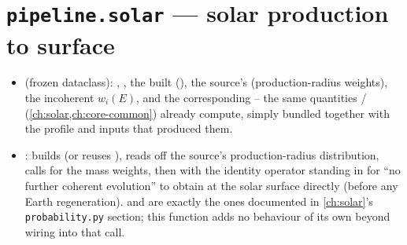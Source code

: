 \section{\texttt{pipeline.solar} --- solar production to surface}


\begin{implbox}
\begin{itemize}
  \item {} (frozen dataclass): ,
    , the built 
    (), the source's
     (production-radius weights), the
    incoherent  $w_i(E)$, and the corresponding
     -- the same quantities
    /
    (\cref{ch:solar,ch:core-common}) already compute, simply bundled
    together with the profile and inputs that produced them.
  \item {}: builds (or reuses
    ), reads off the source's production-radius
    distribution, calls  for the mass
    weights, then  with the identity
    operator standing in for ``no further coherent evolution'' to obtain
     at the solar surface directly (before any
    Earth regeneration).  and  are
    exactly the ones documented in \cref{ch:solar}'s
    \texttt{probability.py} section; this function adds no behaviour of
    its own beyond wiring  into that call.
\end{itemize}
\end{implbox}

